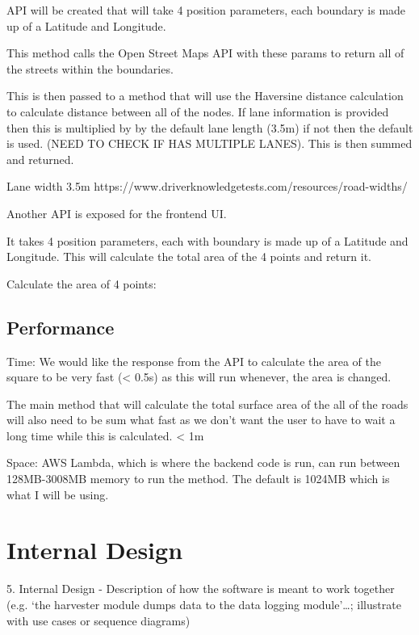 \documentclass[a4paper,11pt]{article}
\begin{document}
API will be created that will take 4 position parameters, each boundary is made up of a Latitude and Longitude.

This method calls the Open Street Maps API with these params to return all of the streets within the boundaries.

This is then passed to a method that will use the Haversine distance calculation to calculate distance between all of the nodes. If lane information is provided then this is multiplied by by the default lane length (3.5m) if not then the default is used. (NEED TO CHECK IF HAS MULTIPLE LANES). This is then summed and returned.

Lane width 3.5m https://www.driverknowledgetests.com/resources/road-widths/


Another API is exposed for the frontend UI.

It takes 4 position parameters, each with boundary is made up of a Latitude and Longitude. This will calculate the total area of the 4 points and return it.

Calculate the area of 4 points:

\subsection{Performance}


Time:
We would like the response from the API to calculate the area of the square to be very fast (< 0.5s) as this will run whenever, the area is changed.

The main method that will calculate the total surface area of the all of the roads will also need to be sum what fast as we don't want the user to have to wait a long time while this is calculated. < 1m

Space:
AWS Lambda, which is where the backend code is run, can run between 128MB-3008MB memory to run the method. The default is 1024MB which is what I will be using.


\section{Internal Design}

5. Internal Design - Description of how the software is meant to work together (e.g. ‘the harvester module dumps data to the data logging module’…; illustrate with use cases or sequence diagrams)
\end{document}
